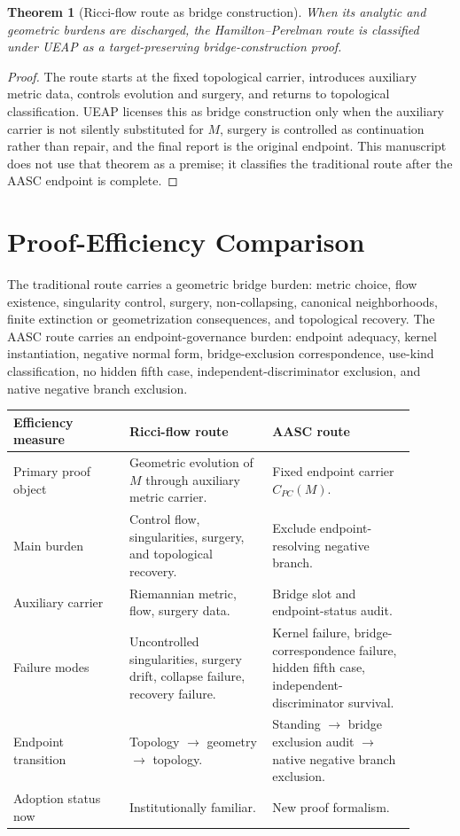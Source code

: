 \documentclass[11pt]{article}
\newtheorem{theorem}{Theorem}[section]
\newcommand{\CarrierPC}{C_{PC}}
\begin{document}
\begin{theorem}[Ricci-flow route as bridge construction]
When its analytic and geometric burdens are discharged, the Hamilton--Perelman route is classified under UEAP as a target-preserving bridge-construction proof.
\end{theorem}
\begin{proof}
The route starts at the fixed topological carrier, introduces auxiliary metric data, controls evolution and surgery, and returns to topological classification. UEAP licenses this as bridge construction only when the auxiliary carrier is not silently substituted for \(M\), surgery is controlled as continuation rather than repair, and the final report is the original endpoint. This manuscript does not use that theorem as a premise; it classifies the traditional route after the AASC endpoint is complete.
\end{proof}

\section{Proof-Efficiency Comparison}\label{sec:efficiency}

The traditional route carries a geometric bridge burden: metric choice, flow existence, singularity control, surgery, non-collapsing, canonical neighborhoods, finite extinction or geometrization consequences, and topological recovery. The AASC route carries an endpoint-governance burden: endpoint adequacy, kernel instantiation, negative normal form, bridge-exclusion correspondence, use-kind classification, no hidden fifth case, independent-discriminator exclusion, and native negative branch exclusion.

\begin{longtable}{L{0.26\linewidth}L{0.32\linewidth}L{0.32\linewidth}}
\toprule
\textbf{Efficiency measure} & \textbf{Ricci-flow route} & \textbf{AASC route}\\
\midrule
Primary proof object & Geometric evolution of \(M\) through auxiliary metric carrier. & Fixed endpoint carrier \(\CarrierPC(M)\).\\
Main burden & Control flow, singularities, surgery, and topological recovery. & Exclude endpoint-resolving negative branch.\\
Auxiliary carrier & Riemannian metric, flow, surgery data. & Bridge slot and endpoint-status audit.\\
Failure modes & Uncontrolled singularities, surgery drift, collapse failure, recovery failure. & Kernel failure, bridge-correspondence failure, hidden fifth case, independent-discriminator survival.\\
Endpoint transition & Topology \(\to\) geometry \(\to\) topology. & Standing \(\to\) bridge exclusion audit \(\to\) native negative branch exclusion.\\
Adoption status now & Institutionally familiar. & New proof formalism.\\
\bottomrule
\end{longtable}
\end{document}
